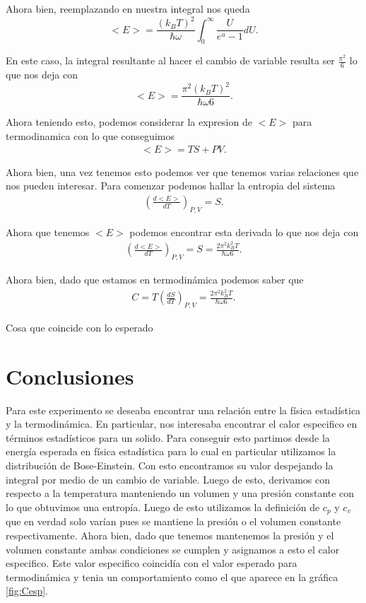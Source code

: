 \documentclass[a4paper, amsfonts, amssymb, amsmath, reprint, showkeys, nofootinbib, twoside]{revtex4-1}
\begin{document}
Ahora bien, reemplazando en nuestra integral nos queda
\begin{equation}
  \label{eq:ERINT}
  <E> = \frac{\left( k_B  T\right)^{2} }{\hbar\omega}\int_0^{\infty}\frac{U}{e^{u}-1}dU
.\end{equation}

En este caso, la integral resultante al hacer el cambio de variable resulta ser $\frac{\pi^2}{6}$ lo que nos deja con
\begin{equation}
  \label{eq:IS}
  <E> = \frac{\pi^2\left( k_B  T\right)^{2} }{\hbar\omega 6}
.\end{equation}

Ahora teniendo esto, podemos considerar la expresion de $<E>$ para termodinamica con lo que conseguimos
 \begin{align*}
  <E> = TS + PV
.\end{align*}

Ahora bien, una vez tenemos esto podemos ver que tenemos varias relaciones que nos pueden interesar. Para comenzar podemos hallar la entropia del sistema
\begin{align*}
  \left( \frac{d<E>}{dT} \right)_{P,V} = S
.\end{align*}

Ahora que tenemos $<E>$ podemos encontrar esta derivada lo que nos deja con
\begin{align*}
  \left( \frac{d<E>}{dT} \right)_{P,V} = S = \frac{2\pi^2k_B^2T}{\hbar\omega 6}
.\end{align*}

Ahora bien, dado que estamos en termodinámica podemos saber que
\begin{align*}
  C = T\left( \frac{dS}{dT} \right)_{P,V} = \frac{2\pi^2k_B^2 T}{\hbar\omega 6}
.\end{align*}

Cosa que coincide con lo esperado 
\section{Conclusiones}

Para este experimento se deseaba encontrar una relación entre la física estadística y la termodinámica. En particular, nos interesaba encontrar el calor especifico en términos estadísticos para un solido. Para conseguir esto partimos desde la energía esperada en física estadística para lo cual en particular utilizamos la distribución de Bose-Einstein. Con esto encontramos su valor despejando la integral por medio de un cambio de variable. Luego de esto, derivamos con respecto a la temperatura manteniendo un volumen y una presión constante con lo que obtuvimos una entropía. Luego de esto utilizamos la definición de $c_p$ y $c_v$ que en verdad solo varían pues se mantiene la presión o el volumen constante respectivamente. Ahora bien, dado que tenemos mantenemos la presión y el volumen constante ambas condiciones se cumplen y asignamos a esto el calor especifico. Este valor especifico coincidía con el valor esperado para termodinámica y tenia un comportamiento como el que aparece en la gráfica \ref{fig:Cesp}.
\end{document}
